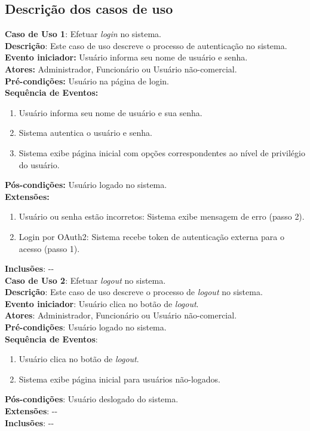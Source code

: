\documentclass[]{politex}
\begin{document}
\subsection{Descrição dos casos de uso}

\noindent \textbf{Caso de Uso 1}: Efetuar \textit{login} no sistema. \\
\textbf{Descrição}: Este caso de uso descreve o processo de autenticação no sistema. \\
\textbf{Evento iniciador:} Usuário informa seu nome de usuário e senha. \\
\textbf{Atores:} Administrador, Funcionário ou Usuário não-comercial. \\
\textbf{Pré-condições:} Usuário na página de login. \\
\textbf{Sequência de Eventos:}
\begin{enumerate}
\item Usuário informa seu nome de usuário e sua senha.
\item Sistema autentica o usuário e senha.
\item Sistema exibe página inicial com opções correspondentes ao nível de privilégio do usuário.
\end{enumerate}
\textbf{Pós-condições:} Usuário logado no sistema. \\
\textbf{Extensões:}
\begin{enumerate}
\item Usuário ou senha estão incorretos: Sistema exibe mensagem de erro (passo 2).
\item Login por OAuth2: Sistema recebe token de autenticação externa para o acesso (passo 1).
\end{enumerate}
\textbf{Inclusões}: -{}- \\

\noindent \textbf{Caso de Uso 2}: Efetuar \textit{logout} no sistema. \\
\textbf{Descrição}: Este caso de uso descreve o processo de \textit{logout} no sistema. \\
\textbf{Evento iniciador}: Usuário clica no botão de \textit{logout}. \\
\textbf{Atores}: Administrador, Funcionário ou Usuário não-comercial. \\
\textbf{Pré-condições}: Usuário logado no sistema. \\
\textbf{Sequência de Eventos}:
\begin{enumerate}
\item Usuário clica no botão de \textit{logout}.
\item Sistema exibe página inicial para usuários não-logados.
\end{enumerate}
\textbf{Pós-condições}: Usuário deslogado do sistema. \\
\textbf{Extensões}: -{}- \\
\textbf{Inclusões}: -{}- \\
\end{document}
